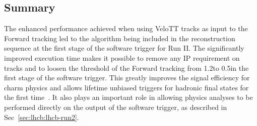 \subsection{Summary}
\label{sec:up-track-run2:summary}

The enhanced performance achieved when using VeloTT tracks as input to the Forward tracking led to the algorithm being included in the reconstruction sequence at the first stage of the software trigger for Run II. The significantly improved execution time makes it possible to remove any IP requirement on \velo tracks and to loosen the \pt threshold of the Forward tracking from 1.2\gevc to 0.5\gevc in the first stage of the software trigger. This greatly improves the signal efficiency for charm physics and allows lifetime unbiased triggers for hadronic final states for the first time~\cite{hlt-runII}. It also plays an important role in allowing physics analyses to be performed directly on the output of the software trigger, as described in Sec~\ref{sec:lhcb:lhcb-run2}.